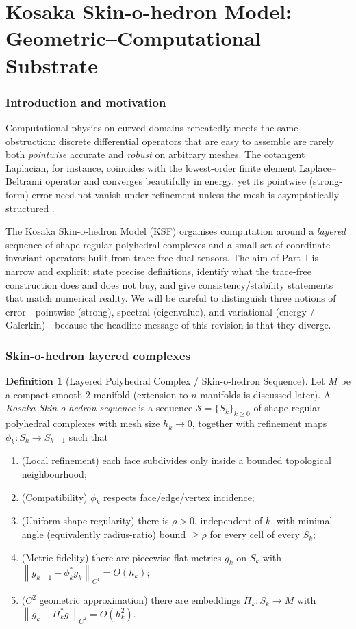 \documentclass[11pt]{article}
\theoremstyle{plain}
\theoremstyle{definition}
\newtheorem{definition}[theorem]{Definition}
\theoremstyle{remark}
\newcommand{\norm}[1]{\left\lVert #1 \right\rVert}
\newcommand{\Order}{O}
\begin{document}
\part{Kosaka Skin-o-hedron Model: Geometric--Computational Substrate}

\section{Introduction and motivation}
Computational physics on curved domains repeatedly meets the same obstruction:
discrete differential operators that are easy to assemble are rarely both
\emph{pointwise} accurate and \emph{robust} on arbitrary meshes. The
cotangent Laplacian, for instance, coincides with the lowest-order finite
element Laplace--Beltrami operator and converges beautifully in energy, yet its
pointwise (strong-form) error need not vanish under refinement unless the mesh
is asymptotically structured \citep{xu2004discrete,hildebrandt2006convergence}.

The Kosaka Skin-o-hedron Model (KSF) organises computation around a
\emph{layered} sequence of shape-regular polyhedral complexes and a small set of
coordinate-invariant operators built from trace-free dual tensors. The aim of
Part~I is narrow and explicit: state precise definitions, identify what the
trace-free construction does and does not buy, and give consistency/stability
statements that match numerical reality. We will be careful to distinguish three
notions of error---pointwise (strong), spectral (eigenvalue), and variational
(energy / Galerkin)---because the headline message of this revision is that they
diverge.

\section{Skin-o-hedron layered complexes}
\begin{definition}[Layered Polyhedral Complex / Skin-o-hedron Sequence]
\label{def:layered}
Let $M$ be a compact smooth 2-manifold (extension to $n$-manifolds is discussed
later). A \emph{Kosaka Skin-o-hedron sequence} is a sequence
$\mathcal{S}=\{S_k\}_{k\ge 0}$ of shape-regular polyhedral complexes with mesh
size $h_k\to 0$, together with refinement maps $\phi_k:S_k\to S_{k+1}$ such that
\begin{enumerate}[leftmargin=16pt]
  \item (Local refinement) each face subdivides only inside a bounded
    topological neighbourhood;
  \item (Compatibility) $\phi_k$ respects face/edge/vertex incidence;
  \item (Uniform shape-regularity) there is $\rho>0$, independent of $k$, with
    minimal-angle (equivalently radius-ratio) bound $\ge\rho$ for every cell of
    every $S_k$;
  \item (Metric fidelity) there are piecewise-flat metrics $g_k$ on $S_k$ with
    $\norm{g_{k+1}-\phi_k^* g_k}_{C^1}=\Order(h_k)$;
  \item ($C^2$ geometric approximation) there are embeddings $\Pi_k:S_k\to M$
    with $\norm{g_k-\Pi_k^* g}_{C^2}=\Order(h_k^2)$.
\end{enumerate}
\end{definition}
\end{document}
